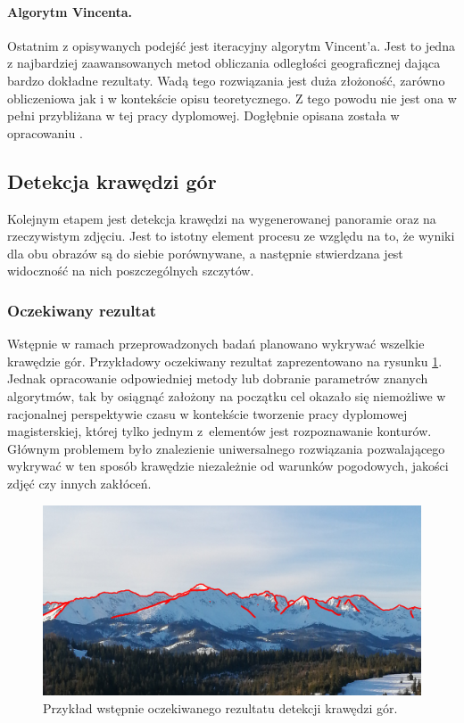 \paragraph{Algorytm Vincenta.}
Ostatnim z opisywanych podejść jest iteracyjny algorytm Vincent'a. Jest to jedna z najbardziej zaawansowanych metod obliczania odległości geograficznej dająca bardzo dokładne rezultaty. Wadą tego rozwiązania jest duża złożoność, zarówno obliczeniowa jak i w kontekście opisu teoretycznego. Z tego powodu nie jest ona w pełni przybliżana w tej pracy dyplomowej. Dogłębnie opisana została w opracowaniu \cite{Vincenty}.



\subsection{Detekcja krawędzi gór} \label{sec:edge_detection}

Kolejnym etapem jest detekcja krawędzi na wygenerowanej panoramie oraz na rzeczywistym zdjęciu. Jest to istotny element procesu ze względu na to, że wyniki dla obu obrazów są do siebie porównywane, a następnie stwierdzana jest widoczność na nich poszczególnych szczytów.

\subsubsection{Oczekiwany rezultat} \label{sec:edge_detection_expected}

Wstępnie w ramach przeprowadzonych badań planowano wykrywać wszelkie krawędzie gór. Przykładowy oczekiwany rezultat zaprezentowano na rysunku \ref{fig:edge_detected_expected}. Jednak opracowanie odpowiedniej metody lub dobranie parametrów znanych algorytmów, tak by osiągnąć założony na początku cel okazało się niemożliwe w racjonalnej perspektywie czasu w kontekście tworzenie pracy dyplomowej magisterskiej, której tylko jednym z~elementów jest rozpoznawanie konturów. Głównym problemem było znalezienie uniwersalnego rozwiązania pozwalającego wykrywać w ten sposób krawędzie niezależnie od warunków pogodowych, jakości zdjęć czy innych zakłóceń.

\begin{figure}[!h]
    \centering \includegraphics[width=0.75\linewidth]{img/image-2023-03-04_072211_edge_expected_2.png}
    \caption{Przykład wstępnie oczekiwanego rezultatu detekcji krawędzi gór.}
    \label{fig:edge_detected_expected}
\end{figure}

